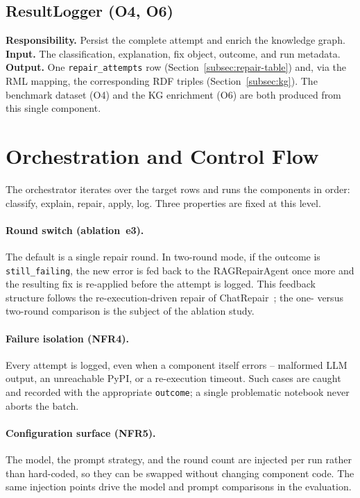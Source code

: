 \subsection{ResultLogger (O4, O6)}
\label{subsec:resultlogger}
\textbf{Responsibility.} Persist the complete attempt and enrich the
knowledge graph.\\
\textbf{Input.} The classification, explanation, fix object, outcome, and
run metadata.\\
\textbf{Output.} One \texttt{repair\_attempts} row
(Section~\ref{subsec:repair-table}) and, via the RML mapping, the
corresponding RDF triples (Section~\ref{subsec:kg}). The benchmark
dataset (O4) and the KG enrichment (O6) are both produced from this
single component.

\section{Orchestration and Control Flow}
\label{sec:orchestrator}

The orchestrator iterates over the target rows and runs the components in
order: classify, explain, repair, apply, log. Three properties are fixed
at this level.

\paragraph{Round switch (ablation~e3).}
The default is a single repair round. In two-round mode, if the outcome is
\texttt{still\_failing}, the new error is fed back to the RAGRepairAgent
once more and the resulting fix is re-applied before the attempt is
logged. This feedback structure follows the re-execution-driven repair of
ChatRepair~\cite{xia2024chatrepair}; %
the one- versus two-round comparison is the subject of the ablation study.

\paragraph{Failure isolation (NFR4).}
Every attempt is logged, even when a component itself errors -- malformed
LLM output, an unreachable PyPI, or a re-execution timeout. Such cases are
caught and recorded with the appropriate \texttt{outcome}; a single
problematic notebook never aborts the batch.

\paragraph{Configuration surface (NFR5).}
The model, the prompt strategy, and the round count are injected per run
rather than hard-coded, so they can be swapped without changing component
code. The same injection points drive the model and prompt comparisons in
the evaluation.


